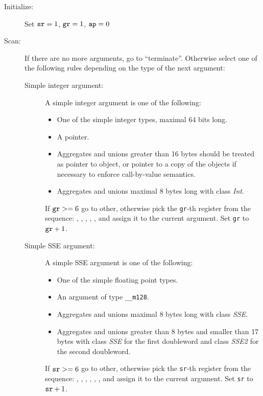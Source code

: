 \begin{description}
  \item[Initialize:]
    Set $\verb|sr|=1$, $\verb|gr|=1$, $\verb|ap|=0$


  \item[Scan:]
    If there are no more arguments, go to ``terminate''. Otherwise select one of the
    following rules depending on the type of the next argument:
      \begin{description}
        \item[Simple integer argument:]
          A simple integer argument is one of the following:
          \begin{itemize}
            \item One of the simple integer types, maximal 64 bits long.
            \item A pointer.
            \item Aggregates and unions greater than 16 bytes should be treated as
              pointer to object, or pointer to a copy of the objects if necessary to enforce
              call-by-value semantics.
            \item Aggregates and unions maximal 8 bytes long with class \emph{Int}.
          \end{itemize}
        If $\verb|gr| >= 6$ go to other, otherwise pick the \verb|gr|-th register from
        the sequence: \RAX, \RDX, \RCX, \RBX, \RSI, \RDI{} and assign it to the current
        argument. Set \verb|gr| to $\verb|gr|+1$.


    \item[Simple SSE argument:]
      A simple SSE argument is one of the following:
      \begin{itemize}
        \item One of the simple floating point types.
        \item An argument of type \verb|__m128|.
        \item Aggregates and unions maximal 8 bytes long with class \emph{SSE}.
        \item Aggregates and unions greater than 8 bytes and smaller
          than 17 bytes with class \emph{SSE} for the first doubleword
          and class \emph{SSE2} for the second doubleword.
      \end{itemize}
      If $\verb|sr| >= 6$ go to other, otherwise pick the \verb|sr|-th
      register from the sequence: , , ,
      , , ,  and assign it to
      the current argument.
      Set \verb|sr| to $\verb|sr|+1$.


\end{description}
\end{description}
